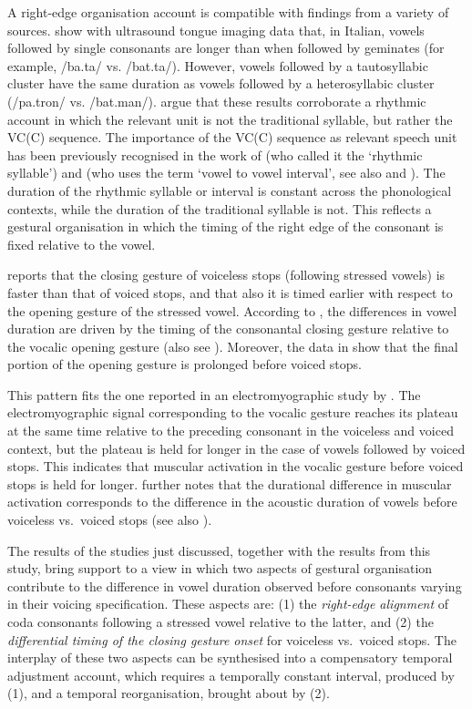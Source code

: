 \documentclass[preprint]{JASAnew}
\begin{document}
A right-edge organisation account is compatible with findings from a
variety of sources. \citet{celata2018} show with ultrasound tongue
imaging data that, in Italian, vowels followed by single consonants are
longer than when followed by geminates (for example, /ba.ta/ vs.
/bat.ta/). However, vowels followed by a tautosyllabic cluster have the
same duration as vowels followed by a heterosyllabic cluster (/pa.tron/
vs. /bat.man/). \citet{celata2018} argue that these results corroborate
a rhythmic account in which the relevant unit is not the traditional
syllable, but rather the VC(C) sequence. The importance of the VC(C)
sequence as relevant speech unit has been previously recognised in the
work of \citet{farnetani1986} (who called it the `rhythmic syllable')
and \citet{steriade2012} (who uses the term `vowel to vowel interval',
see also \citealt{hirsch2014} and \citealt{lunden2017}). The duration of
the rhythmic syllable or interval is constant across the phonological
contexts, while the duration of the traditional syllable is not. This
reflects a gestural organisation in which the timing of the right edge
of the consonant is fixed relative to the vowel.

\citet{de-jong1991} reports that the closing gesture of voiceless stops
(following stressed vowels) is faster than that of voiced stops, and
that also it is timed earlier with respect to the opening gesture of the
stressed vowel. According to \citet{de-jong1991}, the differences in
vowel duration are driven by the timing of the consonantal closing
gesture relative to the vocalic opening gesture (also see
\citealt{hertrich1997}). Moreover, the data in \citet{de-jong1991} show
that the final portion of the opening gesture is prolonged before voiced
stops.

This pattern fits the one reported in an electromyographic study by
\citet{raphael1975}. The electromyographic signal corresponding to the
vocalic gesture reaches its plateau at the same time relative to the
preceding consonant in the voiceless and voiced context, but the plateau
is held for longer in the case of vowels followed by voiced stops. This
indicates that muscular activation in the vocalic gesture before voiced
stops is held for longer. \citet{raphael1975} further notes that the
durational difference in muscular activation corresponds to the
difference in the acoustic duration of vowels before voiceless
vs.~voiced stops (see also \citealt{warren2005}).

The results of the studies just discussed, together with the results
from this study, bring support to a view in which two aspects of
gestural organisation contribute to the difference in vowel duration
observed before consonants varying in their voicing specification. These
aspects are: (1) the \emph{right-edge alignment} of coda consonants
following a stressed vowel relative to the latter, and (2) the
\emph{differential timing of the closing gesture onset} for voiceless
vs.~voiced stops. The interplay of these two aspects can be synthesised
into a compensatory temporal adjustment account, which requires a
temporally constant interval, produced by (1), and a temporal
reorganisation, brought about by (2).
\end{document}
